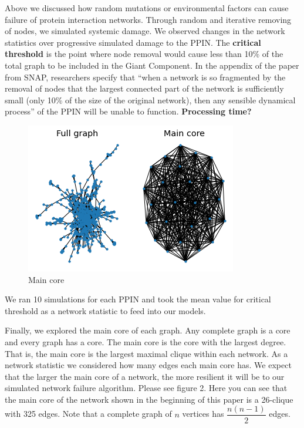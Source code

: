 \documentclass[12pt]{article}
\begin{document}
Above we discussed how random mutations or environmental factors can cause failure of protein interaction networks. Through random and iterative removing of nodes, we simulated systemic damage. We observed changes in the network statistics over progressive simulated damage to the PPIN. The \textbf{critical threshold} is the point where node removal would cause less than 10\% of the total graph to be included in the Giant Component. In the appendix of the paper from SNAP, researchers specify that ``when a network is so fragmented by the removal of nodes that the largest connected part of the network is sufficiently small (only 10\% of the size of the original network), then any sensible dynamical process'' of the PPIN will be unable to function. \textbf{Processing time?} \begin{figure}
\centering
  \includegraphics[width=.4\linewidth]{PPIN_fig7}
  \caption{Main core}
  \label{fig:PPIN_fig7}
\end{figure}  We ran 10 simulations for each PPIN and took the mean value for critical threshold as a network statistic to feed into our models.

Finally, we explored the main core of each graph. Any complete graph is a core and every graph has a core. The main core is the core with the largest degree. That is, the main core is the largest maximal clique within each network. As a network statistic we considered how many edges each main core has. We expect that the larger the main core of a network, the more resilient it will be to our simulated network failure algorithm. Please see figure 2. Here you can see that the main core of the network shown in the beginning of this paper is a 26-clique with 325 edges. Note that a complete graph of $n$ vertices has $\dfrac{n(n-1)}{2}$ edges. 
\end{document}
